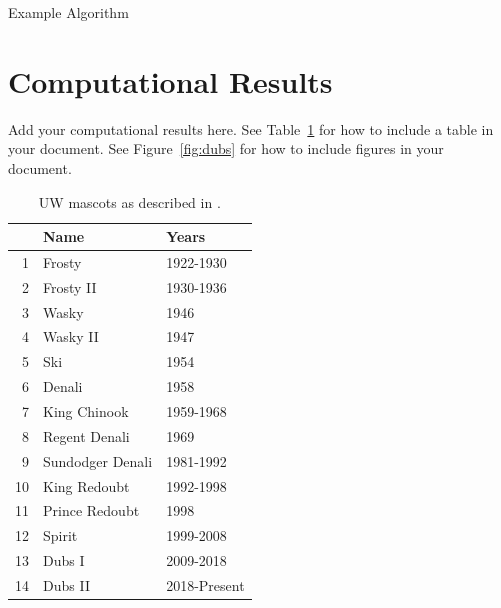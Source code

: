 \documentclass{article}
\begin{document}
\begin{algorithm}
    \begin{algorithmic}
        \ENDFOR
        \ELSE
        \ENDIF
        \ENDIF
    \end{algorithmic}
    \caption{Example Algorithm}
    \label{alg:example}
\end{algorithm}

\section{Computational Results}
Add your computational results here. See Table~\ref{tab:mascots} for how to
include a table in your document. See Figure~\ref{fig:dubs} for how to include
figures in your document.

\begin{table}
    \centering
    \begin{tabular}{rll}
           & Name             & Years        \\
        \hline
        1  & Frosty           & 1922-1930    \\
        2  & Frosty II        & 1930-1936    \\
        3  & Wasky            & 1946         \\
        4  & Wasky II         & 1947         \\
        5  & Ski              & 1954         \\
        6  & Denali           & 1958         \\
        7  & King Chinook     & 1959-1968    \\
        8  & Regent Denali    & 1969         \\
        9  & Sundodger Denali & 1981-1992    \\
        10 & King Redoubt     & 1992-1998    \\
        11 & Prince Redoubt   & 1998         \\
        12 & Spirit           & 1999-2008    \\
        13 & Dubs I           & 2009-2018    \\
        14 & Dubs II          & 2018-Present
    \end{tabular}
    \caption{UW mascots as described in \cite{washington_huskies}.}
    \label{tab:mascots}
\end{table}
\end{document}
